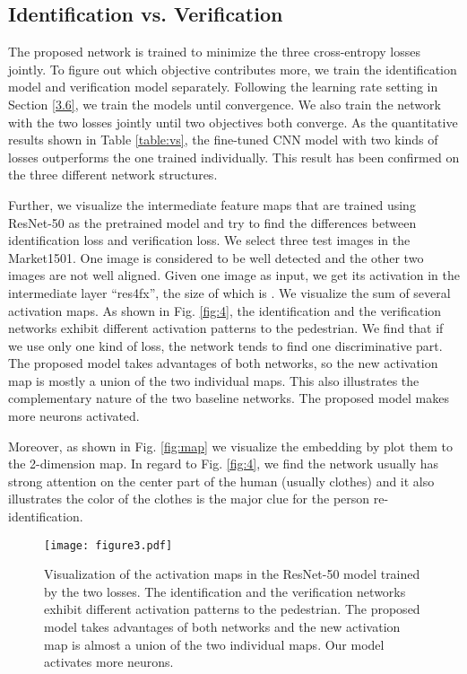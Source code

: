 \documentclass[journal]{IEEEtran}
\begin{document}
\subsection{Identification vs. Verification}
The proposed network is trained to minimize the three cross-entropy losses jointly. To figure out which objective contributes more, we train the identification model and verification model separately. Following the learning rate setting in Section \ref{3.6}, we train the models until convergence. We also train the network with the two losses jointly until two objectives both converge. As the quantitative results shown in Table \ref{table:vs}, the fine-tuned CNN model with two kinds of losses outperforms the one trained individually. This result has been confirmed on the three different network structures.

Further, we visualize the intermediate feature maps that are trained using ResNet-50 \cite{he2016deep} as the pretrained model and try to find the differences between identification loss and verification loss. We select three test images in the Market1501. One image is considered to be well detected and the other two images are not well aligned. Given one image as input, we get its activation in the intermediate layer ``res4fx'', the size of which is .  We visualize the sum of several activation maps. As shown in Fig. \ref{fig:4}, the identification and the verification networks exhibit different activation patterns to the pedestrian.  We find that if we use only one kind of loss, the network tends to find one discriminative part. The proposed model takes advantages of both networks, so the new activation map is mostly a union of the two individual maps. This also illustrates the complementary nature of the two baseline networks. The proposed model makes more neurons activated.  

Moreover, as shown in Fig. \ref{fig:map} we visualize  the  embedding by plot them to the 2-dimension map. In regard to Fig. \ref{fig:4}, we find the network usually has strong attention on the center part of the human (usually clothes) and it also illustrates the color of the clothes is the major clue for the person re-identification. 

\begin{figure}[t]
\begin{center}
\texttt{[image: figure3.pdf]}
\end{center}
   \caption{ Visualization of the activation maps in the ResNet-50 \cite{he2016deep} model trained by the two losses. The identification and the verification networks exhibit different activation patterns to the pedestrian. The proposed model takes advantages of both networks and the new activation map is almost a union of the two individual maps. Our model activates more neurons.}
\label{fig:4}
\label{fig:onecol}
\end{figure}
\end{document}
